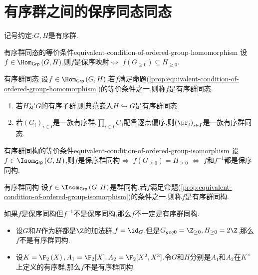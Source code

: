 \section{有序群之间的保序同态同态}

记号约定:$G,H$是有序群.

\begin{proposition}{有序群同态的等价条件}{equivalent-condition-of-ordered-group-homomorphism}
	设$f\in\Hom_{\mathsf{Grp}}\left(G,H\right)$,则$f$是保序映射$\iff$ $f\left(G_{\geqslant 0}\right)\subseteq H_{\geqslant 0}$.
\end{proposition}

\begin{definition}{有序群同态}{}
	设$f\in\Hom_{\mathsf{Grp}}\left(G,H\right)$.若$f$满足命题(\ref{prop:equivalent-condition-of-ordered-group-homomorphism})的等价条件之一,则称$f$是有序群同态.
\end{definition}

\begin{remark}{}{}
	\begin{enumerate}
		\item 若$H$是$G$的有序子群,则典范嵌入$H\hookrightarrow G$是有序群同态.
		\item 若$\left(G_{i}\right)_{i\in I}$是一族有序群,$\prod\limits_{i\in I}G_{i}$配备逐点偏序,则$\left(\pr_{i}\right)_{i\in I}$是一族有序群同态.
	\end{enumerate}
\end{remark}

\begin{proposition}{有序群同构的等价条件}{equivalent-condition-of-ordered-group-isomorphism}
	设$f\in\Isom_{\mathsf{Grp}}\left(G,H\right)$,则$f$是保序群同构$\iff$ $f\left(G_{\geq 0}\right)=H_{\geq 0}$ $\iff$ $f$和$f^{-1}$都是保序同构.
\end{proposition}

\begin{definition}{有序群同构}{}
	设$f\in\Isom_{\mathsf{Grp}}\left(G,H\right)$是群同构.若$f$满足命题(\ref{prop:equivalent-condition-of-ordered-group-isomorphism})的条件之一,则称$f$是有序群同构.
\end{definition}

\begin{remark}{}{}
	如果$f$是保序同构但$f^{-1}$不是保序同构,那么$f$不一定是有序群同构.
	\begin{itemize}
		\item 设$G$和$H$作为群都是$\Z$的加法群,$f=\id_{G}$,但是$G_{geq 0}=\Z_{\geq 0},H_{\geq 0}=2\Z$,那么$f$不是有序群同构.
		\item 设$K=\F_{2}\left(X\right),A_{1}=\F_{2}[X],A_{2}=\F_{2}[X^{2},X^{3}]$.令$G$和$H$分别是$A_{1}$和$A_{2}$在$K^{\times}$上定义的有序群,那么$f$不是有序群同构.
	\end{itemize}
\end{remark}
